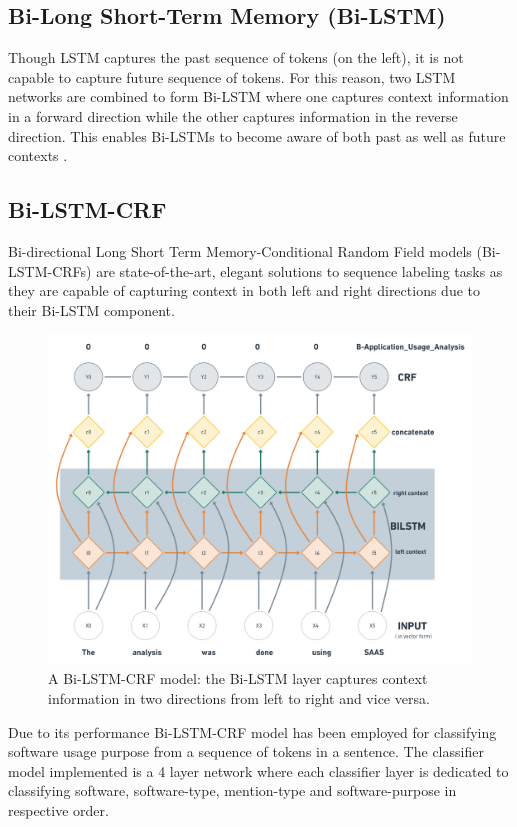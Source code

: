 \subsection{Bi-Long Short-Term Memory (\ac{Bi-LSTM})}
\label{sec:chapter05:DLModels:BiLSTM}

Though \ac{LSTM} captures the past sequence of tokens (on the left), it is not capable to capture future sequence of tokens. For this reason, two LSTM networks are combined to form \ac{Bi-LSTM} where one captures context information in a forward direction while the other captures information in the reverse direction. This enables \ac{Bi-LSTM}s to become aware of both past as well as future contexts \citep{ma2016end}. 

\subsection{\ac{Bi-LSTM-CRF}}
\label{sec:chapter05:DLModels:BiLSTMCRF}

Bi-directional Long Short Term Memory-Conditional Random Field models (\ac{Bi-LSTM-CRF}s) are state-of-the-art, elegant solutions to sequence labeling tasks as they are capable of capturing context in both left and right directions due to their \ac{Bi-LSTM} component. 

\begin{figure}[htbp]
	\centering
	\includegraphics[width=.60\textwidth]{4.graphics/figures/ch_5/Bi-LSTM-CRF}
	\caption{A \ac{Bi-LSTM-CRF} model: the \ac{Bi-LSTM} layer captures context information in two directions from left to right and vice versa. }
	\label{fig:chapter03:setup}
\end{figure}

Due to its performance \ac{Bi-LSTM-CRF} model has been employed for classifying software usage purpose from a sequence of tokens in a sentence. The classifier model implemented is a 4 layer network where each classifier layer is dedicated to classifying software, software-type, mention-type and software-purpose in respective order. \\

